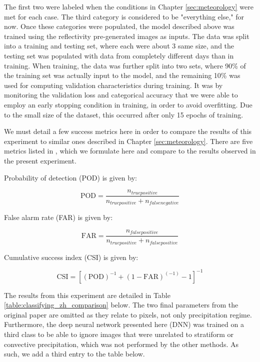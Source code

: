 The first two were labeled when the conditions in Chapter \ref{sec:meteorology} were met for each case.
The third category is considered to be "everything else," for now.
Once these categories were populated, the model described above was trained using the reflectivity pre-generated images as inputs.
The data was split into a training and testing set, where each were about 3 same size, and the testing set was populated with data from completely different days than in training.
When training, the data was further split into two sets, where 90\% of the training set was actually input to the model, and the remaining 10\% was used for computing validation characteristics during training.
It was by monitoring the validation loss and categorical accuracy that we were able to employ an early stopping condition in training, in order to avoid overfitting.
Due to the small size of the dataset, this occurred after only 15 epochs of training.

We must detail a few success metrics here in order to compare the results of this experiment to similar ones described in Chapter \ref{sec:meteorology}.
There are five metrics listed in \cite{anagnostou2004convective}, which we formulate here and compare to the results observed in the present experiment.

Probability of detection (POD) is given by:

\begin{equation}
\mathrm{POD} = \frac{n_{true positive}}{n_{true positive} + n_{false negative}}
\end{equation}

False alarm rate (FAR) is given by:

\begin{equation}
\mathrm{FAR} = \frac{n_{false positive}}{n_{true positive} + n_{false positive}}
\end{equation}

Cumulative success index (CSI) is given by:

\begin{equation}
\mathrm{CSI} = \left[\left(\mathrm{POD}\right)^{-1}+(1-\mathrm{FAR})^(-1)-1\right]^{-1}
\end{equation}

The results from this experiment are detailed in Table \ref{table:classifying_zh_comparison} below. 
The two final parameters from the original paper\cite{anagnostou2004convective} are omitted as they relate to pixels, not only precipitation regime.
Furthermore, the deep neural network presented here (DNN) was trained on a third class to be able to ignore images that were unrelated to stratiform or convective precipitation, which was not performed by the other methods.
As such, we add a third entry to the table below.

